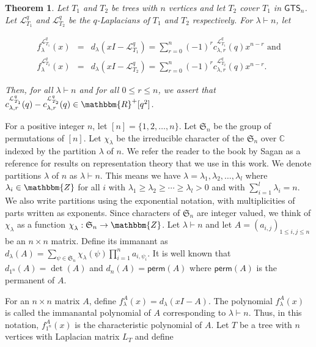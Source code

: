 \documentclass[12pt]{article}
\newtheorem{theorem}{Theorem}
\newcommand{\sL}{  \mathcal{ L}}
\newcommand{\RR}{ \mathbbm{R}}
\newcommand{\ZZ}{ \mathbbm{Z}}
\newcommand{\rar}{ \rightarrow}
\newcommand{\SSS}{\mathfrak{S}}
\newcommand{\CC}{ \mathbb{C}}
\newcommand{\GTS}{\mathsf{GTS}}
\newcommand{\perm}{  \mathsf{perm}}
\begin{document}
\begin{theorem}
  \label{thm:main}
Let $T_1$ and $T_2$ be trees with $n$ vertices and let $T_2$ cover $T_1$ in $\GTS_n$.  Let
$\sL_{T_1}^q$ and $\sL_{T_2}^q$ be the $q$-Laplacians of $T_1$ and $T_2$ respectively.  
For $\lambda \vdash n$, let 

\begin{eqnarray*}
f^{\sL_{T_1}^q}_{\lambda}(x) & = & d_{\lambda}(xI -\sL_{T_1}^q) = \sum_{r=0}^n (-1)^r 
c_{\lambda,r}^{\sL_{T_1}^q}(q) x^{n-r} \mbox{ and} \\
f^{\sL_{T_2}^q}_{\lambda}(x) & = & d_{\lambda}(xI -\sL_{T_2}^q) = \sum_{r=0}^n (-1)^r 
c_{\lambda,r}^{\sL_{T_2}^q}(q) x^{n-r}.
\end{eqnarray*}

Then, for all $\lambda \vdash n$ and for all $0 \leq r \leq n$, we assert that 
$c_{\lambda,r}^{\sL_{T_1}^q}(q) - c_{\lambda,r}^{\sL_{T_2}^q}(q) 
\in \RR^+[q^2]$.   
\end{theorem}



For a positive integer $n$, let $[n] = \{1,2,\ldots,n\}$.
Let $\SSS_n$ be the group of permutations of $[n]$.
Let $\chi_{\lambda}^{}$ be the irreducible character of the 
$\SSS_n$ over $\CC$ indexed by the partition $\lambda$ 
of $n$.  We refer the reader to the book by Sagan \cite{sagan-book}
as a reference for results on representation theory that we 
use in this work.
We denote partitions $\lambda$ of $n$ as $\lambda \vdash n$.  This means
we have $\lambda = \lambda_1, \lambda_2, \ldots, \lambda_l$ where $\lambda_i \in \ZZ$ 
for all $i$ with  $\lambda_1 \geq \lambda_2 \geq \cdots \geq \lambda_l > 0$ and with
$\sum_{i=1}^l \lambda_i = n$. We also write partitions using the exponential notation, 
with multiplicities of parts written as exponents.  Since characters of $\SSS_n$ are 
integer valued,  
we think of $\chi_{\lambda}^{}$ as a function $\chi_{\lambda}^{}: \SSS_n \rar \ZZ$. 
Let $\lambda \vdash n$ and let 
$A = (a_{i,j})_{1\leq i,j \leq n}$ be an $n \times n$ matrix.  Define its immanant as
$\displaystyle d_{\lambda}(A) = 
\sum_{\psi \in \SSS_n} \chi_{\lambda}^{}(\psi) \prod_{i=1}^n a_{i,\psi_i}.$
It is well known that $d_{1^n}(A)= \det(A)$ and $d_{n}(A)= \perm(A)$ where
$\perm(A)$ is the permanent of $A$.  

For an $n \times n$ matrix $A$, define 
$f_{\lambda}^A(x)= \displaystyle d_{\lambda}(xI-A)$.  
The polynomial $f_{\lambda}^A(x)$ is called the immanantal polynomial of $A$ corresponding to 
$\lambda \vdash n$. 
Thus, in this notation, $f_{1^n}^A(x)$ is the characteristic polynomial of $A$.  
Let $T$ be a tree with $n$ vertices with Laplacian matrix $L_T$ and define 
\end{document}
